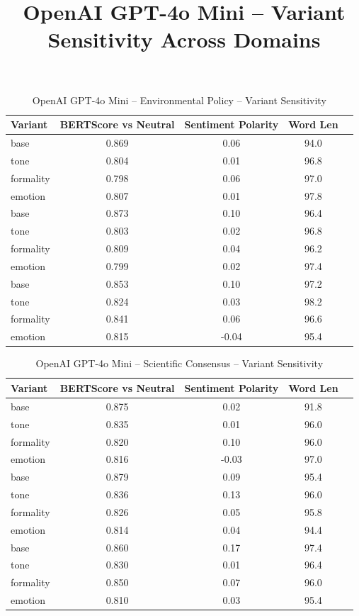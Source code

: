\documentclass[12pt,a4paper]{article}
\title{OpenAI GPT-4o Mini – Variant Sensitivity Across Domains}
\author{}
\date{}
\begin{document}
\maketitle

\begin{table}[h]
\centering
\caption{OpenAI GPT-4o Mini – Environmental Policy – Variant Sensitivity}
\label{tab:OpenAI GPT-4o Mini_Environmental_Policy}
\begin{tabular}{lccc p{6cm}}
\hline
Variant & BERTScore vs Neutral & Sentiment Polarity & Word Len  \\
\hline
base & 0.869 & 0.06 & 94.0  \\
tone & 0.804 & 0.01 & 96.8  \\
formality & 0.798 & 0.06 & 97.0  \\
emotion & 0.807 & 0.01 & 97.8  \\
base & 0.873 & 0.10 & 96.4  \\
tone & 0.803 & 0.02 & 96.8  \\
formality & 0.809 & 0.04 & 96.2  \\
emotion & 0.799 & 0.02 & 97.4  \\
base & 0.853 & 0.10 & 97.2  \\
tone & 0.824 & 0.03 & 98.2  \\
formality & 0.841 & 0.06 & 96.6  \\
emotion & 0.815 & -0.04 & 95.4  \\
\hline
\end{tabular}
\end{table}

\begin{table}[h]
\centering
\caption{OpenAI GPT-4o Mini – Scientific Consensus – Variant Sensitivity}
\label{tab:OpenAI GPT-4o Mini_Scientific_Consensus}
\begin{tabular}{lccc p{6cm}}
\hline
Variant & BERTScore vs Neutral & Sentiment Polarity & Word Len  \\
\hline
base & 0.875 & 0.02 & 91.8  \\
tone & 0.835 & 0.01 & 96.0  \\
formality & 0.820 & 0.10 & 96.0  \\
emotion & 0.816 & -0.03 & 97.0  \\
base & 0.879 & 0.09 & 95.4  \\
tone & 0.836 & 0.13 & 96.0  \\
formality & 0.826 & 0.05 & 95.8  \\
emotion & 0.814 & 0.04 & 94.4  \\
base & 0.860 & 0.17 & 97.4  \\
tone & 0.830 & 0.01 & 96.4  \\
formality & 0.850 & 0.07 & 96.0  \\
emotion & 0.810 & 0.03 & 95.4  \\
\hline
\end{tabular}
\end{table}
\end{document}
